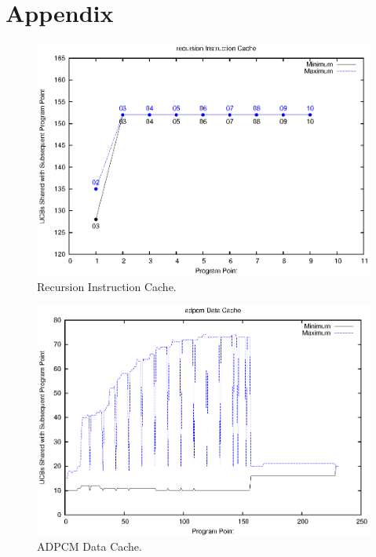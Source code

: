 %
\clearpage
%
\section{Appendix}\label{sec:appendix}
%
\vspace{-20pt}
\begin{figure}[h!]
\begin{center}
\includegraphics[width=\linewidth]{eps/recursion-icache.eps}
\caption{Recursion Instruction Cache.}
\label{fig:recursion_instruction_cache}
\end{center}
\end{figure}
%
\vspace{-20pt}
\begin{figure}[h!]
\begin{center}
\includegraphics[width=\linewidth]{eps/adpcm-dcache.eps}
\caption{ADPCM Data Cache.}
\label{fig:adpcm_data_cache}
\end{center}
\end{figure}
